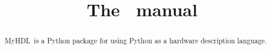 \documentclass{manual}
\title{The \myhdl\ manual}
\newcommand{\myhdl}{{MyHDL}}
\begin{document}
\maketitle



\begin{abstract}

\noindent
\myhdl\ is a Python package for using Python as a hardware description
language. 

\end{abstract}

\tableofcontents




\end{document}

